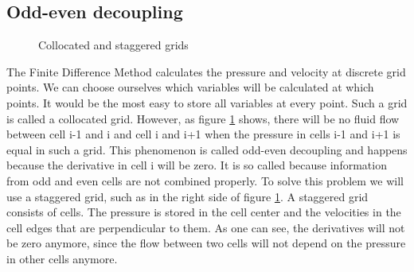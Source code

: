 \documentclass{article}
\begin{document}
\subsection{Odd-even decoupling} \label{odd-even}

\begin{figure}[h]
\centering
{} \caption{Collocated and staggered grids} \label{Odd-even decoupling} \end{figure}
The Finite Difference Method calculates the pressure and velocity at discrete grid points. We can choose ourselves which variables will be calculated at which points. It would be the most easy to store all variables at every point. Such a grid is called a collocated grid\cite{Staggered grid}. However, as figure \ref{Odd-even decoupling} shows, there will be no fluid flow between cell i-1 and i and cell i and i+1 when the pressure in cells i-1 and i+1 is equal in such a grid. This phenomenon is called odd-even decoupling and happens because the derivative in cell i will be zero\cite{Staggered grid}. It is so called because information from odd and even cells are not combined properly\cite{Staggered grid}. To solve this problem we will use a staggered grid, such as in the right side of figure \ref{Odd-even decoupling}. A staggered grid consists of cells. The pressure is stored in the cell center and the velocities in the cell edges that are perpendicular to them\cite{Staggered grid}. As one can see, the derivatives will not be zero anymore, since the flow between two cells will not depend on the pressure in other cells anymore.
\newpage
\end{document}
